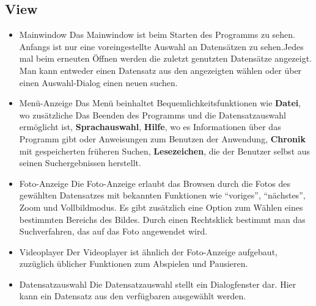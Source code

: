 \subsection{View}
\begin{itemize}
\item Mainwindow \newline
Das Mainwindow ist beim Starten des Programms zu sehen. Anfangs ist nur eine voreingestellte Auswahl an Datensätzen zu sehen.Jedes mal beim erneuten Öffnen werden die zuletzt genutzten Datensätze angezeigt. Man kann entweder einen Datensatz aus den angezeigten wählen oder über einen Auswahl-Dialog einen neuen suchen.
\item Menü-Anzeige \newline
Das Menü beinhaltet Bequemlichkeitsfunktionen wie \textbf{Datei}, wo zusätzliche Das Beenden des Programms und die Datensatzauswahl ermöglicht ist, \textbf{Sprachauswahl}, \textbf{Hilfe}, wo es Informationen über das Programm gibt oder Anweisungen zum Benutzen der Anwendung, \textbf{Chronik} mit gespeicherten früheren Suchen, \textbf{Lesezeichen}, die der Benutzer selbst aus seinen Suchergebnissen herstellt.
\item Foto-Anzeige \newline
Die Foto-Anzeige erlaubt das Browsen durch die Fotos des gewählten Datensatzes mit bekannten Funktionen wie \enquote{voriges}, \enquote{nächstes}, Zoom und Vollbildmodus. Es gibt zusätzlich eine Option zum Wählen eines bestimmten Bereichs des Bildes. Durch einen Rechtsklick bestimmt man das Suchverfahren, das auf das Foto angewendet wird.
\item Videoplayer \newline
Der Videoplayer ist ähnlich der Foto-Anzeige aufgebaut, zuzüglich üblicher Funktionen zum Abspielen und Pausieren.
\item Datensatzauswahl \newline
Die Datensatzauswahl stellt ein Dialogfenster dar. Hier kann ein Datensatz aus den verfügbaren ausgewählt werden.
\end{itemize}	

\pagebreak
